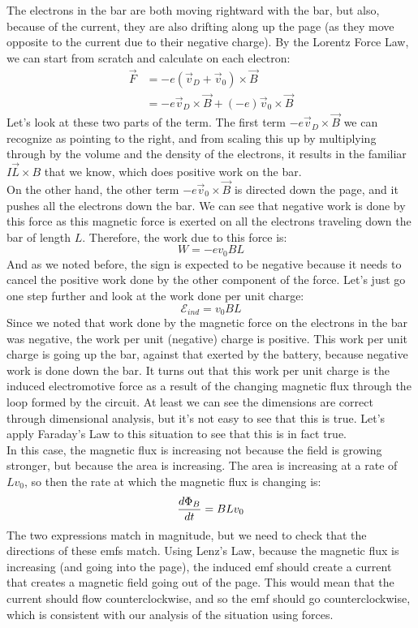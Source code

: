 The electrons in the bar are both moving rightward with the bar, but also, because of the current, they are also drifting along up the page (as they move opposite to the current due to their negative charge). By the Lorentz Force Law, we can start from scratch and calculate on each electron:
\begin{align*}
	\vec F &= -e(\vec v_D + \vec v_0) \times \vec B\\
	&= -e\vec v_D \times \vec B + (-e) \vec v_0 \times \vec B
\end{align*}
Let's look at these two parts of the term. The first term $-e \vec v_D \times \vec B$ we can recognize as pointing to the right, and from scaling this up by multiplying through by the volume and the density of the electrons, it results in the familiar $I \vec L \times B$ that we know, which does positive work on the bar. \\
On the other hand, the other term $-e \vec v_0 \times \vec B$ is directed down the page, and it pushes all the electrons down the bar. We can see that negative work is done by this force as this magnetic force is exerted on all the electrons traveling down the bar of length $L$. Therefore, the work due to this force is:
\[
	W = -ev_0BL
\]
And as we noted before, the sign is expected to be negative because it needs to cancel the positive work done by the other component of the force. Let's just go one step further and look at the work done per unit charge:
\[
	\mathscr{E}_{ind} = v_0BL
\]
Since we noted that work done by the magnetic force on the electrons in the bar was negative, the work per unit (negative) charge is positive. This work per unit charge is going up the bar, against that exerted by the battery, because negative work is done down the bar. It turns out that this work per unit charge is the induced electromotive force as a result of the changing magnetic flux through the loop formed by the circuit. At least we can see the dimensions are correct through dimensional analysis, but it's not easy to see that this is true. Let's apply Faraday's Law to this situation to see that this is in fact true. \\
In this case, the magnetic flux is increasing not because the field is growing stronger, but because the area is increasing. The area is increasing at a rate of $Lv_0$, so then the rate at which the magnetic flux is changing is:
\[
	\frac{d \Phi_B}{d t} = BLv_0
\]
The two expressions match in magnitude, but we need to check that the directions of these emfs match. Using Lenz's Law, because the magnetic flux is increasing (and going into the page), the induced emf should create a current that creates a magnetic field going out of the page. This would mean that the current should flow counterclockwise, and so the emf should go counterclockwise, which is consistent with our analysis of the situation using forces. \\
